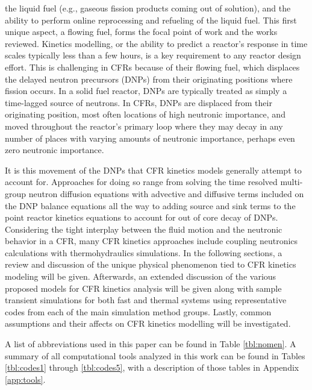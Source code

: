 \documentclass[review]{elsarticle}
\begin{document}
 the liquid fuel (e.g., gaseous fission products coming out of solution),
and the ability to perform online reprocessing and refueling of the liquid fuel.
 This first unique aspect, a flowing fuel, forms the focal point of work and the
  works reviewed. Kinetics modelling, or the ability to predict
a reactor's response in time scales typically less than a few hours, is a key
requirement to any reactor design effort. This is challenging in CFRs
because of their flowing fuel, which displaces the delayed neutron precursors
 (DNPs) from their originating positions where fission occurs. In a solid fuel
reactor, DNPs are typically treated as simply a time-lagged source of neutrons.
In CFRs, DNPs are displaced from their originating position, most often locations
of high neutronic importance, and moved throughout the reactor's primary loop
where they may decay in any number of places with varying amounts of
neutronic importance, perhaps even zero neutronic importance. 
\par It is this movement of the DNPs that CFR kinetics models generally
attempt to account for. Approaches for doing so range from solving the 
time resolved multi-group neutron diffusion equations with advective and
diffusive terms included on the DNP balance equations all the way to adding
source and sink terms to the point reactor kinetics equations to account
for out of core decay of DNPs. Considering the tight interplay between the
fluid motion and the neutronic behavior in a CFR, many CFR kinetics approaches
include coupling neutronics calculations with thermohydraulics simulations. In the
following sections, a review and discussion of the
unique physical phenomenon tied to CFR kinetics modeling will be given. 
Afterwards, an extended discussion of the various proposed models for CFR
kinetics analysis will be given along with sample transient simulations for
both fast and thermal systems using representative codes from each of the main
simulation method groups. Lastly, common assumptions and their affects on CFR
kinetics modelling will be investigated.
\par A list of abbreviations used in this paper can be found in Table
\ref{tbl:nomen}. A summary of all computational tools analyzed
in this work can be found in Tables \ref{tbl:codes1} through \ref{tbl:codes5},
 with a description of those tables in Appendix \ref{app:tools}.
\end{document}
